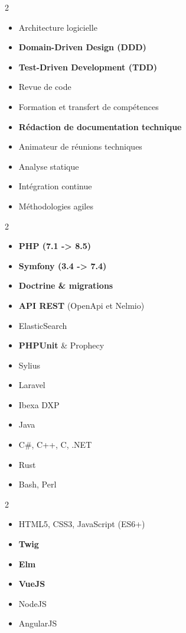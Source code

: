
\vspace{-2mm}
\begin{multicols}{2}
	\begin{itemize}[label=\textbullet]
		\item Architecture logicielle
		\item \textbf{Domain-Driven Design (DDD)}
		\item \textbf{Test-Driven Development (TDD)}
		\item Revue de code
		\item Formation et transfert de compétences
		\item \textbf{Rédaction de documentation technique}
		\item Animateur de réunions techniques
		\item Analyse statique
		\item Intégration continue
		\item Méthodologies agiles
	\end{itemize}
\end{multicols}


\vspace{-4mm}
\begin{multicols}{2}
	\begin{itemize}[label=\textbullet]
		\item \textbf{PHP (7.1 -> 8.5)}
		\item \textbf{Symfony (3.4 -> 7.4)}
		\item \textbf{Doctrine \& migrations}
		\item \textbf{API REST} (OpenApi et Nelmio)
		\item ElasticSearch
		\item \textbf{PHPUnit} \& Prophecy
		\item Sylius
		\item Laravel
		\item Ibexa DXP
		\item Java
		\item C\#, C++, C, .NET
		\item Rust
		\item Bash, Perl
	\end{itemize}
\end{multicols}

\vspace{-4mm}
\begin{multicols}{2}
	\begin{itemize}[label=\textbullet]
		\item HTML5, CSS3, JavaScript (ES6+)
		\item \textbf{Twig}
		\item \textbf{Elm}
		\item \textbf{VueJS}
		\item NodeJS
		\item AngularJS
	\end{itemize}
\end{multicols}

